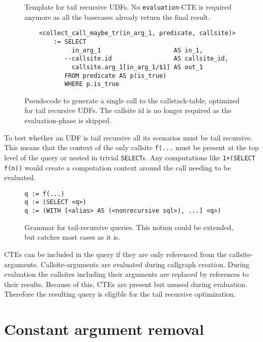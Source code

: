 \begin{figure}
    \centering
    \caption{Template for tail recursive UDFs. No \texttt{evaluation}-CTE is required anymore as all the basecases already return the final result.}
    \label{tr_opt_template}
\end{figure}


\begin{figure}[h!]\centering\small
    \begin{verbatim}
    <collect_call_maybe_tr(in_arg_1, predicate, callsite)>
        := SELECT
             in_arg_1                    AS in_1, 
           --callsite.id                 AS callsite_id,
             callsite.arg_1[in_arg_1/$1] AS out_1
           FROM predicate AS p(is_true)
           WHERE p.is_true
    \end{verbatim}
  \caption{Pseudocode to generate a single call to the callstack-table, optimized for tail recursive UDFs. The callsite id is no longer required as the evaluation-phase is skipped.}
  \label{marco:collect_call_maybe_optimized}
\end{figure}

To test whether an UDF is tail recursive all its scenarios must be tail recursive. This means that the context of the only callsite \texttt{f(...} must be present at the top level of the query or nested in trivial \texttt{SELECT}s. Any computations like \texttt{1+(SELECT f(n))} would create a computation context around the call needing to be evaluated.

\begin{figure}
    \centering
\begin{verbatim}
q := f(...)
q := (SELECT <q>)
q := (WITH [<alias> AS (<nonrecursive sql>), ...] <q>)
\end{verbatim}
    \caption{Grammar for tail-recursive queries. This notion could be extended, but catches most cases as it is.}
    \label{tr_grammar}
\end{figure}

CTEs can be included in the query if they are only referenced from the callsite-arguments. Callsite-arguments are evaluated during callgraph creation. During evaluation the callsites including their arguments are replaced by references to their results. Because of this, CTEs are present but unused during evaluation. Therefore the resulting query is eligible for the tail recursive optimization.

\section{Constant argument removal}

